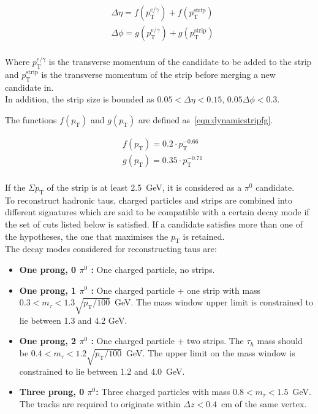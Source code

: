 \begin{equation}\label{eqn:dynamicstrip}
\begin{split}
&\Delta \eta  = f(p_{\text{T}}^{e/\gamma}) + f(p_{\text{T}}^{\text{strip}})\\
&\Delta \phi  = g(p_{\text{T}}^{e/\gamma}) + g(p_{\text{T}}^{\text{strip}})\\
\end{split}
\end{equation}

Where $p_{\text{T}}^{e/\gamma}$ is the transverse momentum of the candidate to be added to the strip
and $p_{\text{T}}^{\text{strip}}$ is the transverse momentum of the strip before merging a new candidate in.\\
In addition, the strip size is bounded as $0.05 < \Delta\eta < 0.15$, $0.05 \Delta\phi < 0.3$.

The functions $f(p_{\text{T}})$ and $g(p_{\text{T}})$ are defined as~\ref{eqn:dynamicstripfg}.

\begin{equation}\label{eqn:dynamicstripfg}
\begin{split}
&f(p_{\text{T}}) = 0.2\cdot p_{\text{T}}^{-0.66}\\
&g(p_{\text{T}}) = 0.35\cdot p_{\text{T}}^{-0.71}\\
\end{split}
\end{equation}

If the $\Sigma p_{\text{T}}$ of the strip is at least 2.5~GeV, it is considered as a $\pi^0$ candidate.\\
 To reconstruct hadronic taus, charged particles and strips are combined into different signatures which are said to be
compatible with a certain decay mode if the set of cuts listed below is satisfied. If a candidate satisfies more than one of the hypotheses, the one that maximises the $p_{\text{T}}$ is retained.\\

The decay modes considered for reconstructing taus are:\\
\begin{itemize}
\item \textbf{One prong, 0 $\pi^0$ :} One charged particle, no strips.
\item \textbf{One prong, 1 $\pi^0$ :} One charged particle + one strip with mass $ 0.3 < m_{\tau} < 1.3 \sqrt{p_{\text{T}}/100}$~GeV. The mass window upper limit is constrained to lie between 1.3 and 4.2 GeV.
\item \textbf{One prong, 2 $\pi^0$ :} One charged particle + two strips. The $\tau_{h}$ mass should be $0.4 < m_{\tau} < 1.2\sqrt{p_{\text{T}}/100}$~GeV. The upper limit on the mass window is constrained to lie between 1.2 and 4.0~GeV.
\item \textbf{Three prong, 0 $\pi^0$: } Three charged particles with mass $0.8 < m_{\tau} < 1.5$~GeV. The tracks are required to originate within $\Delta z<0.4$~cm of the same vertex.
\end{itemize}

